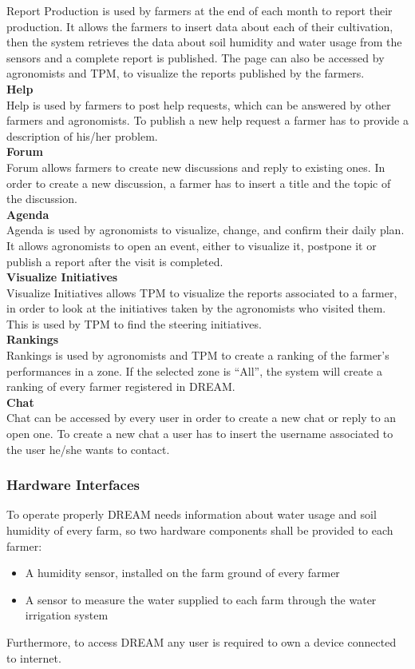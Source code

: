 Report Production is used by farmers at the end of each month to report their production. It allows the farmers to insert data about each of their cultivation, then the system retrieves the data about soil humidity and water usage from the sensors and a complete report is published. The page can also be accessed by agronomists and TPM, to visualize the reports published by the farmers.\\
\newline
\textbf{Help}\\
Help is used by farmers to post help requests, which can be answered by other farmers and agronomists. To publish a new help request a farmer has to provide a description of his/her problem.\\
\newline
\textbf{Forum}\\
Forum allows farmers to create new discussions and reply to existing ones. In order to create a new discussion, a farmer has to insert a title and the topic of the discussion.\\
\newline
\textbf{Agenda}\\
Agenda is used by agronomists to visualize, change, and confirm their daily plan. It allows agronomists to open an event, either to visualize it, postpone it or publish a report after the visit is completed.\\
\newline
\textbf{Visualize Initiatives}\\
Visualize Initiatives allows TPM to visualize the reports associated to a farmer, in order to look at the initiatives taken by the agronomists who visited them. This is used by TPM to find the steering initiatives.\\
\newline
\textbf{Rankings}\\
Rankings is used by agronomists and TPM to create a ranking of the farmer’s performances in a zone. If the selected zone is “All”, the system will create a ranking of every farmer registered in DREAM.\\
\newline
\textbf{Chat}\\
Chat can be accessed by every user in order to create a new chat or reply to an open one. To create a new chat a user has to insert the username associated to the user he/she wants to contact.
\subsubsection{Hardware Interfaces}
To operate properly DREAM needs information about water usage and soil humidity of every farm, so two hardware components shall be provided to each farmer:
\begin{itemize}
    \item A humidity sensor, installed on the farm ground of every farmer
    \item A sensor to measure the water supplied to each farm through the water irrigation system
\end{itemize}
Furthermore, to access DREAM any user is required to own a device connected to internet.
